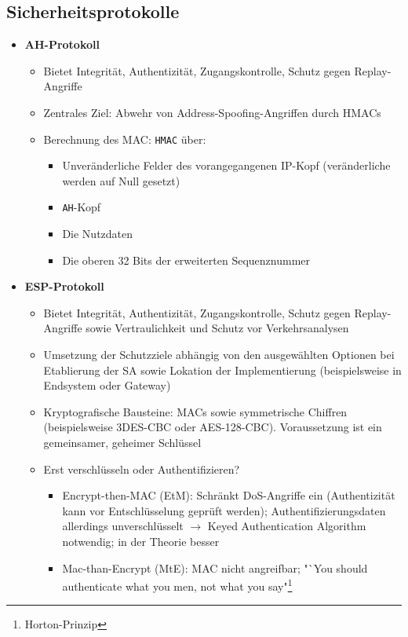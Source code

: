 \subsection{Sicherheitsprotokolle}
\begin{itemize}
	\item \textbf{AH-Protokoll}
	\begin{itemize}
		\item Bietet Integrität, Authentizität, Zugangskontrolle, Schutz gegen Replay-Angriffe
		\item Zentrales Ziel: Abwehr von Address-Spoofing-Angriffen durch HMACs
		\item Berechnung des MAC: \texttt{HMAC} über:
		\begin{itemize}
			\item Unveränderliche Felder des vorangegangenen IP-Kopf (veränderliche werden auf Null gesetzt)
			\item \texttt{AH}-Kopf
			\item Die Nutzdaten
			\item Die oberen 32 Bits der erweiterten Sequenznummer
		\end{itemize}
	\end{itemize}
	\item \textbf{ESP-Protokoll}
	\begin{itemize}
		\item Bietet Integrität, Authentizität, Zugangskontrolle, Schutz gegen Replay-Angriffe sowie Vertraulichkeit und Schutz vor Verkehrsanalysen
		\item Umsetzung der Schutzziele abhängig von den ausgewählten Optionen bei Etablierung der SA sowie Lokation der Implementierung (beispielsweise in Endsystem oder Gateway)
		\item Kryptografische Bausteine: MACs sowie symmetrische Chiffren (beispielsweise 
		3DES-CBC oder AES-128-CBC). Voraussetzung ist ein gemeinsamer, geheimer Schlüssel
		\item Erst verschlüsseln oder Authentifizieren?
		\begin{itemize}
			\item Encrypt-then-MAC (EtM): Schränkt DoS-Angriffe ein (Authentizität kann vor Entschlüsselung geprüft werden); Authentifizierungsdaten allerdings unverschlüsselt \(\rightarrow\) Keyed Authentication Algorithm notwendig; in der Theorie besser
			\item Mac-than-Encrypt (MtE): MAC nicht angreifbar; "`You should authenticate what you men, not what you say"\footnote{Horton-Prinzip}
		\end{itemize}

\end{itemize}
\end{itemize}
